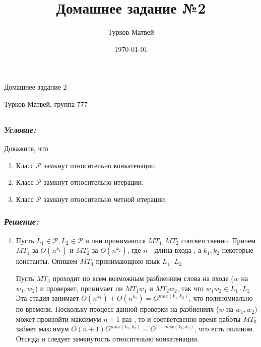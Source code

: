 \documentclass[a4paper, 11pt]{article} %
\author{Турков Матвей}
\title{Домашнее задание №2}
\date{\today}
\newcommand*\circled[1]{\tikz[baseline=(char.base)]{
            \node[shape=circle,draw,inner sep=2pt] (char) {#1};}}
\begin{document}
\begin{center}
  \begin{Large}
    Домашнее задание 2
  \end{Large}
\end{center}
\begin{center}
  \begin{Large}
    Турков Матвей, группа 777
  \end{Large}
\end{center}

	\hfill \break	
\subsection*{\circled{1}} 
\subsubsection*{\textit{Условие:}}	
 Докажите, что 
\begin{enumerate}
    \item Класс $\mathcal{P}$ замкнут относительно конкатенации.
    \item Класс $\mathcal{P}$ замкнут относительно итерации.
    \item Класс $\mathcal{P}$ замкнут относительно четной итерации.
\end{enumerate}
\subsubsection*{\textit{Решение:}}
\begin{enumerate}
\item Пусть $L_1 \in \mathcal{P},L_2 \in \mathcal{P} $ и они принимаются $MT_1 , MT_2$ соответственно. Причем $MT_1$ за $O(n^{k_1})$ и $MT_2$ за $O(n^{k_2})$, где $n$ - длина входа , а $k_1,k_2$ некоторые константы. Опишем $MT_3$ принимающюю язык $L_1 \cdot L_2$
\par Пусть $MT_3$ проходит по всем возможным разбиениям слова на входе 
($w$ на $w_1,w_2$) и проверяет, принимает ли $MT_1 w_1$ и  $MT_2 w_2$, так что $w_1w_2 \in L_1 \cdot L_2$ Эта стадия занимает $O(n^{k_1}) + O(n^{k_2}) = O^{max(k_1,k_2)}$, что полиномиально по времени. Поскольку процесс данной проверки на разбиениях ($w$ на $w_1,w_2$) может произойти максимум $n+1$ раз , то и соответсвенно время работы $MT_3$ займет максимум $O(n+1)O^{max(k_1,k_2)} = O^{1+max(k_1,k_2)}$, что есть полином. Отсюда и следует замкнутость относительно конкатенации.  
\end{enumerate}
\end{document}
